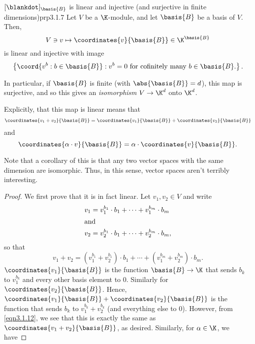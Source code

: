 \begin{prp}{$[\blankdot ]_{\basis{B}}$ is linear and injective (and surjective in finite dimensions)}{prp3.1.7}
Let $V$ be a $\K$-module, and let $\basis{B}$ be a basis of $V$.  Then,
\begin{equation}
	V\ni v\mapsto \coordinates{v}{\basis{B}}\in \K ^{\basis{B}}
\end{equation}
is linear and injective with image
\begin{equation}
	\left\{ \coord{v^b:b\in \basis{B}}:v^b=0\text{ for cofinitely many }b\in \basis{B}\text{.}\right\} .
\end{equation}
\begin{rmk}
	In particular, if $\basis{B}$ is finite (with $\abs{\basis{B}}=d$), this map is surjective, and so this gives an \emph{isomorphism} $V\rightarrow \K ^d$ onto $\K ^d$.
\end{rmk}
\begin{rmk}
	Explicitly, that this map is linear means that
	\begin{equation}
		\coordinates{v_1+v_2}{\basis{B}}=\coordinates{v_1}{\basis{B}}+\coordinates{v_2}{\basis{B}}
	\end{equation}
	and
	\begin{equation}
		\coordinates{\alpha \cdot v}{\basis{B}}=\alpha \cdot \coordinates{v}{\basis{B}}.
	\end{equation}
\end{rmk}
\begin{rmk}
	Note that a corollary of this is that any two vector spaces with the same dimension are isomorphic.  Thus, in this sense, vector spaces aren't terribly interesting.
\end{rmk}
\begin{proof}
	We first prove that it is in fact linear.  Let $v_1,v_2\in V$ and write
	\begin{align}
		v_1 & =v_1^{b_1}\cdot b_1+\cdots +v_1^{b_m}\cdot b_m \\
		\intertext{and}
		v_2 & =v_2^{b_1}\cdot b_1+\cdots +v_2^{b_m}\cdot b_m,
	\end{align}
	so that
	\begin{equation}\label{eqn3.1.12}
		v_1+v_2=(v_1^{b_1}+v_2^{b_1})\cdot b_1+\cdots +(v_1^{b_m}+v_2^{b_m})\cdot b_m.
	\end{equation}
	$\coordinates{v_1}{\basis{B}}$ is the function $\basis{B}\rightarrow \K$ that sends $b_k$ to $v_1^{b_k}$ and every other basis element to $0$.  Similarly for $\coordinates{v_2}{\basis{B}}$.  Hence, $\coordinates{v_1}{\basis{B}}+\coordinates{v_2}{\basis{B}}$ is the function that sends $b_k$ to $v_1^{b_k}+v_2^{b_k}$ (and everything else to $0$).  However, from \eqref{eqn3.1.12}, we see that this is exactly the same as $\coordinates{v_1+v_2}{\basis{B}}$, as desired.  Similarly, for $\alpha \in \K$, we have

\end{proof}
\end{prp}
